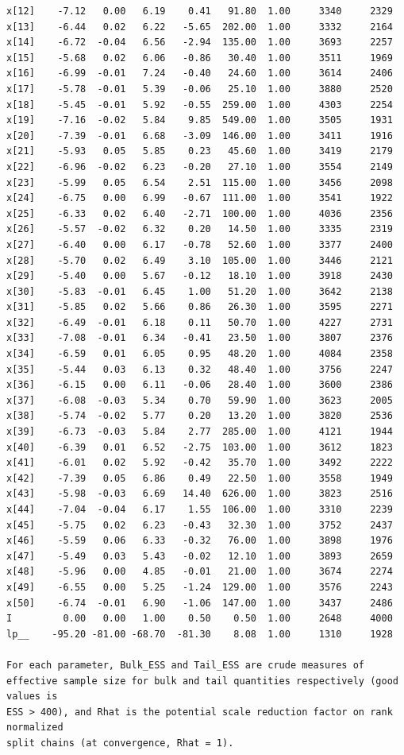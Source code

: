 \documentclass[american,]{article}
\begin{document}
\begin{verbatim}
x[12]    -7.12   0.00   6.19    0.41   91.80  1.00     3340     2329
x[13]    -6.44   0.02   6.22   -5.65  202.00  1.00     3332     2164
x[14]    -6.72  -0.04   6.56   -2.94  135.00  1.00     3693     2257
x[15]    -5.68   0.02   6.06   -0.86   30.40  1.00     3511     1969
x[16]    -6.99  -0.01   7.24   -0.40   24.60  1.00     3614     2406
x[17]    -5.78  -0.01   5.39   -0.06   25.10  1.00     3880     2520
x[18]    -5.45  -0.01   5.92   -0.55  259.00  1.00     4303     2254
x[19]    -7.16  -0.02   5.84    9.85  549.00  1.00     3505     1931
x[20]    -7.39  -0.01   6.68   -3.09  146.00  1.00     3411     1916
x[21]    -5.93   0.05   5.85    0.23   45.60  1.00     3419     2179
x[22]    -6.96  -0.02   6.23   -0.20   27.10  1.00     3554     2149
x[23]    -5.99   0.05   6.54    2.51  115.00  1.00     3456     2098
x[24]    -6.75   0.00   6.99   -0.67  111.00  1.00     3541     1922
x[25]    -6.33   0.02   6.40   -2.71  100.00  1.00     4036     2356
x[26]    -5.57  -0.02   6.32    0.20   14.50  1.00     3335     2319
x[27]    -6.40   0.00   6.17   -0.78   52.60  1.00     3377     2400
x[28]    -5.70   0.02   6.49    3.10  105.00  1.00     3446     2121
x[29]    -5.40   0.00   5.67   -0.12   18.10  1.00     3918     2430
x[30]    -5.83  -0.01   6.45    1.00   51.20  1.00     3642     2138
x[31]    -5.85   0.02   5.66    0.86   26.30  1.00     3595     2271
x[32]    -6.49  -0.01   6.18    0.11   50.70  1.00     4227     2731
x[33]    -7.08  -0.01   6.34   -0.41   23.50  1.00     3807     2376
x[34]    -6.59   0.01   6.05    0.95   48.20  1.00     4084     2358
x[35]    -5.44   0.03   6.13    0.32   48.40  1.00     3756     2247
x[36]    -6.15   0.00   6.11   -0.06   28.40  1.00     3600     2386
x[37]    -6.08  -0.03   5.34    0.70   59.90  1.00     3623     2005
x[38]    -5.74  -0.02   5.77    0.20   13.20  1.00     3820     2536
x[39]    -6.73  -0.03   5.84    2.77  285.00  1.00     4121     1944
x[40]    -6.39   0.01   6.52   -2.75  103.00  1.00     3612     1823
x[41]    -6.01   0.02   5.92   -0.42   35.70  1.00     3492     2222
x[42]    -7.39   0.05   6.86    0.49   22.50  1.00     3558     1949
x[43]    -5.98  -0.03   6.69   14.40  626.00  1.00     3823     2516
x[44]    -7.04  -0.04   6.17    1.55  106.00  1.00     3310     2239
x[45]    -5.75   0.02   6.23   -0.43   32.30  1.00     3752     2437
x[46]    -5.59   0.06   6.33   -0.32   76.00  1.00     3898     1976
x[47]    -5.49   0.03   5.43   -0.02   12.10  1.00     3893     2659
x[48]    -5.96   0.00   4.85   -0.01   21.00  1.00     3674     2274
x[49]    -6.55   0.00   5.25   -1.24  129.00  1.00     3576     2243
x[50]    -6.74  -0.01   6.90   -1.06  147.00  1.00     3437     2486
I         0.00   0.00   1.00    0.50    0.50  1.00     2648     4000
lp__    -95.20 -81.00 -68.70  -81.30    8.08  1.00     1310     1928

For each parameter, Bulk_ESS and Tail_ESS are crude measures of 
effective sample size for bulk and tail quantities respectively (good values is 
ESS > 400), and Rhat is the potential scale reduction factor on rank normalized
split chains (at convergence, Rhat = 1).
\end{verbatim}
\end{document}

